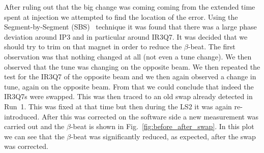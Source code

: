 \documentclass[a4paper]{cernatsnote}
\begin{document}
After ruling out that the big change was coming coming from the extended time spent at injection we attempted to find the location of the error. Using the Segment-by-Segment (SBS)~\cite{} technique it was found that there was a large phase deviation around IP3 and in particular around IR3Q7. It was decided that we should try to trim on that magnet in order to reduce the $\beta$-beat. The first observation was that nothing changed at all (not even a tune change). We then observed that the tune was changing on the opposite beam. We then repeated the test for the IR3Q7 of the opposite beam and we then again observed a change in tune, again on the opposite beam. From that we could conclude that indeed the IR3Q7s were swapped. This was then traced to an old swap already detected in Run~1. This was fixed at that time but then during the LS2 it was again re-introduced. After this was corrected on the software side a new measurement was carried out and the $\beta$-beat is shown in Fig.~\ref{fig:before_after_swap}. In this plot we can see that the $\beta$-beat was significantly reduced, as expected, after the swap was corrected.  
\end{document}
